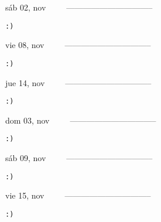 \documentclass[letterpaper,10pt]{article}
\begin{document}
\begin{multicols}{3}
{sáb 02, nov\ \ \ \ \ --------------------------------}
\begin{flushright}\begin{small}\texttt{:)}\end{small}\end{flushright}
\vfill
{vie 08, nov\ \ \ \ \ --------------------------------}
\begin{flushright}\begin{small}\texttt{:)}\end{small}\end{flushright}\par
\vfill
{jue 14, nov\ \ \ \ \ --------------------------------}
\begin{flushright}\begin{small}\texttt{:)}\end{small}\end{flushright}\par
\vfill
\end{multicols}
\vspace{1.05cm}

\begin{multicols}{3}
{dom 03, nov\ \ \ \ \ --------------------------------}
\begin{flushright}\begin{small}\texttt{:)}\end{small}\end{flushright}
\vfill
{sáb 09, nov\ \ \ \ \ --------------------------------}
\begin{flushright}\begin{small}\texttt{:)}\end{small}\end{flushright}\par
\vfill
{vie 15, nov\ \ \ \ \ --------------------------------}
\begin{flushright}\begin{small}\texttt{:)}\end{small}\end{flushright}\par
\vfill
\end{multicols}
\vspace{1.05cm}
\end{document}
